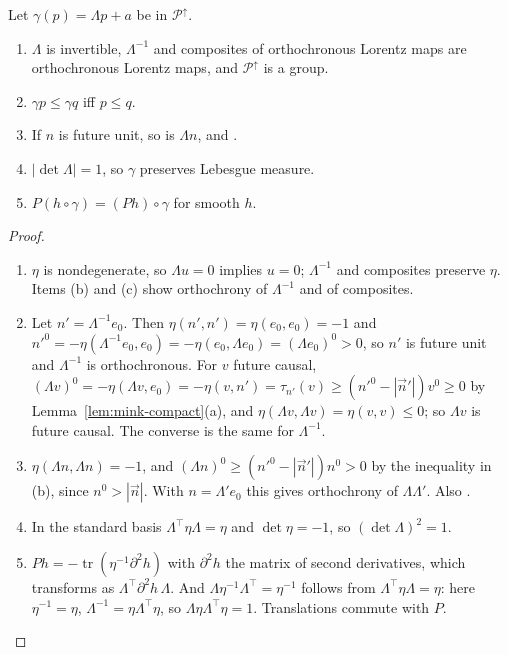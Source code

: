 \begin{lemma}\label{lem:mink-lorentz}
Let $\gamma(p)=\Lambda p+a$ be in $\mathcal P^\uparrow$.
\begin{enumerate}[label=(\alph*),leftmargin=2.5em]
\item $\Lambda$ is invertible, $\Lambda^{-1}$ and composites of orthochronous Lorentz maps are
orthochronous Lorentz maps, and $\mathcal P^\uparrow$ is a group.
\item $\gamma p\leq\gamma q$ iff $p\leq q$.
\item If $n$ is future unit, so is $\Lambda n$, and .
\item $|\det\Lambda|=1$, so $\gamma$ preserves Lebesgue measure.
\item $P(h\circ\gamma)=(Ph)\circ\gamma$ for smooth $h$.
\end{enumerate}
\end{lemma}
\begin{proof}
\begin{enumerate}[leftmargin=2.5em]
\item[(a)] $\eta$ is nondegenerate, so $\Lambda u=0$ implies $u=0$; $\Lambda^{-1}$ and composites
preserve $\eta$. Items (b) and (c) show orthochrony of $\Lambda^{-1}$ and of composites.
\item[(b)] Let $n'=\Lambda^{-1}e_0$. Then $\eta(n',n')=\eta(e_0,e_0)=-1$ and
$n'^0=-\eta(\Lambda^{-1}e_0,e_0)=-\eta(e_0,\Lambda e_0)=(\Lambda e_0)^0>0$, so $n'$ is future unit and
$\Lambda^{-1}$ is orthochronous. For $v$ future causal,
$(\Lambda v)^0=-\eta(\Lambda v,e_0)=-\eta(v,n')=\tau_{n'}(v)\geq(n'^0-|\vec n'|)v^0\geq0$ by
Lemma~\ref{lem:mink-compact}(a), and $\eta(\Lambda v,\Lambda v)=\eta(v,v)\leq0$; so $\Lambda v$ is future
causal. The converse is the same for $\Lambda^{-1}$.
\item[(c)] $\eta(\Lambda n,\Lambda n)=-1$, and $(\Lambda n)^0\geq(n'^0-|\vec n'|)n^0>0$ by the inequality
in (b), since $n^0>|\vec n|$. With $n=\Lambda'e_0$ this gives orthochrony of $\Lambda\Lambda'$. Also
.
\item[(d)] In the standard basis $\Lambda^\top\eta\Lambda=\eta$ and $\det\eta=-1$, so
$(\det\Lambda)^2=1$.
\item[(e)] $Ph=-\operatorname{tr}(\eta^{-1}\partial^2h)$ with $\partial^2h$ the matrix of second
derivatives, which transforms as $\Lambda^\top\partial^2h\,\Lambda$. And
$\Lambda\eta^{-1}\Lambda^\top=\eta^{-1}$ follows from $\Lambda^\top\eta\Lambda=\eta$: here $\eta^{-1}=\eta$,
$\Lambda^{-1}=\eta\Lambda^\top\eta$, so $\Lambda\eta\Lambda^\top\eta=1$. Translations commute with $P$.
\end{enumerate}
\end{proof}

